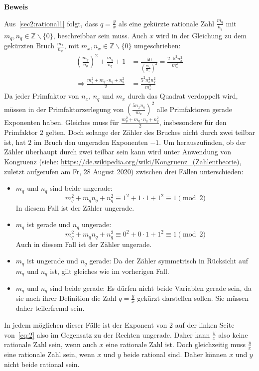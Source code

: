 \documentclass[10pt, a4paper, reqno]{amsart}
\makeatletter
\renewcommand\proofname{Beweis}
\renewenvironment{proof}[1][\proofname]{\par
\pushQED{\qed}%
\normalfont \topsep6\p@\@plus6\p@\relax
\trivlist
\item\relax
{\bfseries#1}\hspace\labelsep\ignorespaces
}{%
\popQED\endtrivlist\@endpefalse
}
\makeatother
\begin{document}
\begin{proof}
  Aus~\autoref{sec2:rational1} folgt, dass $q=\frac{y}{x}$ als eine gekürzte
  rationale Zahl $\frac{m_q}{n_q}$ mit $m_q,n_q\in\mathbb{Z}\backslash\{0\}$,
  beschreibbar sein muss. Auch $x$ wird in der Gleichung zu dem gekürzten Bruch $\frac{m_x}{n_x}$, mit
  $m_x,n_x\in\mathbb{Z}\backslash\{0\}$ umgeschrieben:
  \begin{equation}
    \label{eq:2}
    \begin{split}
      \left(\frac{m_q}{n_q}\right)^2+\frac{m_q}{n_q}+1&=\frac{50}{\left(\frac{m_x}{n_x}\right)^2}=\frac{2\cdot 5^2n_x^2}{m_x^2}\\
      \Rightarrow \frac{m_q^2+m_q\cdot n_q +
        n_q^2}{2}&=\frac{5^2n_x^2n_q^2}{m_x^2}
    \end{split}
  \end{equation}
  Da jeder Primfaktor von $n_x$, $n_q$ und $m_x$ durch das Quadrat verdoppelt
  wird, müssen in der Primfaktorzerlegung von $(\frac{5n_xn_q}{m_x})^2$ alle
  Primfaktoren gerade Exponenten haben. Gleiches muss für
  $\frac{m_q^2+m_q\cdot{}n_q+n_q^2}{2}$, insbesondere für den Primfaktor $2$
  gelten. Doch solange der Zähler des Bruches nicht durch zwei teilbar ist, hat
  $2$ im Bruch den ungeraden Exponenten $-1$. Um herauszufinden, ob der Zähler
  überhaupt durch zwei teilbar sein kann wird unter Anwendung von
  Kongruenz (siehe:
  \url{https://de.wikipedia.org/wiki/Kongruenz_(Zahlentheorie)}, zuletzt
  aufgerufen am Fr, 28 August 2020) zwischen drei Fällen unterschieden:
  \begin{itemize}[itemsep=2ex]
  \item $m_q$ und $n_q$ sind beide ungerade:
    \[m_q^2+m_qn_q+n_q^2\equiv1^2+1\cdot1+1^2\equiv1\pmod{2}\] In
    diesem Fall ist der Zähler ungerade.
  \item $m_q$ ist gerade und $n_q$ ungerade:
    \[m_q^2+m_qn_q+n_q^2\equiv0^2+0\cdot1+1^2\equiv1\pmod{2}\] Auch in diesem Fall ist der Zähler ungerade.
  \item $m_q$ ist ungerade und $n_q$ gerade:
    Da der Zähler symmetrisch in Rücksicht auf $m_q$ und $n_q$ ist, gilt gleiches wie im vorherigen
    Fall.
  \item $m_q$ und $n_q$ sind beide gerade:
    Es dürfen nicht beide Variablen gerade sein, da sie nach ihrer Definition die
    Zahl $q=\frac{y}{x}$ gekürzt darstellen sollen. Sie müssen daher teilerfremd sein.
  \end{itemize}
  In jedem möglichen dieser Fälle ist der Exponent von $2$ auf der linken Seite
  von~\eqref{eq:2} also im Gegensatz zu der Rechten ungerade. Daher kann $\frac{y}{x}$ also keine rationale
  Zahl sein, wenn auch $x$ eine rationale
  Zahl ist. Doch gleichzeitig muss $\frac{y}{x}$ eine rationale Zahl sein, wenn $x$ und $y$ beide rational
  sind.
  Daher können $x$ und $y$ nicht beide rational sein.
\end{proof}
\end{document}
